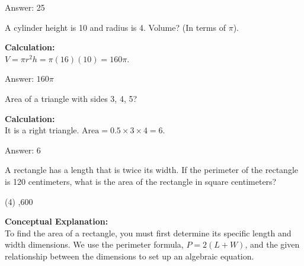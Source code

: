 \documentclass[11pt,paper=a4,answers]{exam}
\begin{document}
\begin{questions}
\begin{solution}
\vspace{30pt}

Answer: \colorbox{yellow!100}{25}
\end{solution}

\vspace{60pt}

\question
A cylinder height is 10 and radius is 4. Volume? (In terms of $\pi$).

\begin{solution}
\textbf{Calculation:} \\
$V = \pi r^2 h = \pi(16)(10) = 160\pi$.

\vspace{30pt}

Answer: \colorbox{yellow!100}{$160\pi$}
\end{solution}

\vspace{60pt}

\question
Area of a triangle with sides 3, 4, 5?

\begin{solution}
\textbf{Calculation:} \\
It is a right triangle. $\text{Area} = 0.5 \times 3 \times 4 = 6$.

\vspace{30pt}

Answer: \colorbox{yellow!100}{6}
\end{solution}

\vspace{60pt}


\question
A rectangle has a length that is twice its width. If the perimeter of the rectangle is 120 centimeters, what is the area of the rectangle in square centimeters?
\begin{tasks}(4)
    ,600
\end{tasks}

\begin{solution}
\textbf{Conceptual Explanation:} \\
To find the area of a rectangle, you must first determine its specific length and width dimensions. We use the perimeter formula, $P = 2(L + W)$, and the given relationship between the dimensions to set up an algebraic equation.


\end{solution}
\end{questions}
\end{document}
